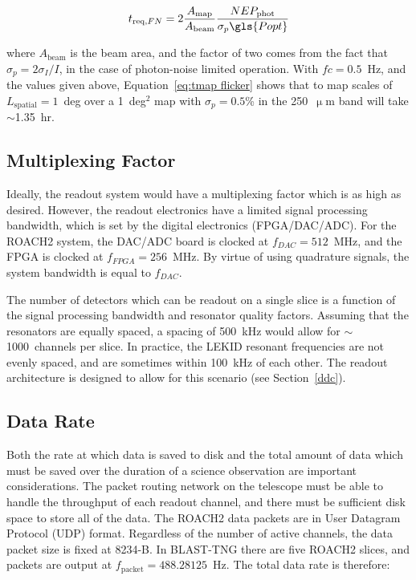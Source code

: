 \begin{equation}\label{eq:tmap flicker}
  t_{\mathrm{req},FN} = 2 \frac{A_{\mathrm{map}}}{A_{\mathrm{beam}}} \frac{NEP_{\mathrm{phot}}}{\sigma_{p}\gls{Popt}}
\end{equation}

where $A_{\mathrm{beam}}$ is the beam area, and the factor of two comes from the fact that $\sigma_{p} = 2 \sigma_{I} / I$, in the case of photon-noise limited operation. With $fc = 0.5$~Hz, and the values given above, Equation~\ref{eq:tmap flicker} shows that to map scales of $L_{\mathrm{spatial}} = 1$~deg over a 1~deg$^{2}$ map with $\sigma_{p} = 0.5$\% in the 250~$\upmu$m band will take $\sim$1.35~hr.

\subsection{Multiplexing Factor}\label{multiplexing}

Ideally, the readout system would have a multiplexing factor which is as high as desired. However, the readout electronics have a limited signal processing bandwidth, which is set by the digital electronics (FPGA/DAC/ADC). For the ROACH2 system, the DAC/ADC board is clocked at $f_{DAC} = 512$~MHz, and the FPGA is clocked at $f_{FPGA} = 256$~MHz. By virtue of using quadrature signals, the system bandwidth is equal to $f_{DAC}$.

The number of detectors which can be readout on a single slice is a function of the signal processing bandwidth and resonator quality factors. Assuming that the resonators are equally spaced, a spacing of 500~kHz would allow for $\sim$1000~channels per slice. In practice, the LEKID resonant frequencies are not evenly spaced, and are sometimes within 100~kHz of each other. The readout architecture is designed to allow for this scenario (see Section~\ref{ddc}).

\subsection{Data Rate}\label{data rate}

Both the rate at which data is saved to disk and the total amount of data which must be saved over the duration of a science observation are important considerations. The packet routing network on the telescope must be able to handle the throughput of each readout channel, and there must be sufficient disk space to store all of the data. The ROACH2 data packets are in User Datagram Protocol (UDP) format. Regardless of the number of active channels, the data packet size is fixed at 8234-B. In BLAST-TNG there are five ROACH2 slices, and packets are output at $f_{\mathrm{packet}} = 488.28125$~Hz. The total data rate is therefore:

